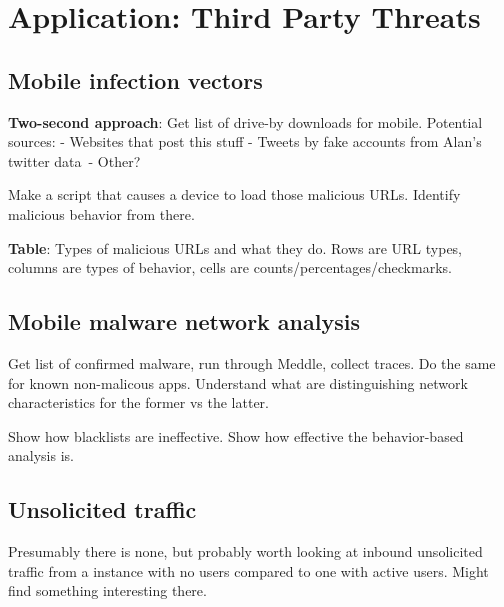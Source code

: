 \section{Application: Third Party Threats}

\subsection{Mobile infection vectors}

\textbf{Two-second approach}: Get list of drive-by downloads for mobile. Potential sources:
- Websites that post this stuff
- Tweets by fake accounts from Alan's twitter data\
- Other?

Make a script that causes a device to load those malicious URLs. Identify malicious behavior from there.

\textbf{Table}: Types of malicious URLs and what they do. Rows are URL types, columns are types of behavior, cells are counts/percentages/checkmarks. 

\subsection{Mobile malware network analysis}

Get list of confirmed malware, run through Meddle, collect traces. Do the same for known non-malicous apps. 
Understand what are distinguishing network characteristics for the former vs the latter. 

Show how blacklists are ineffective. Show how effective the behavior-based analysis is.

\subsection{Unsolicited traffic}
Presumably there is none, but probably worth looking at inbound unsolicited traffic from a 
\meddle instance with no users compared to one with active users. Might find something interesting there.

